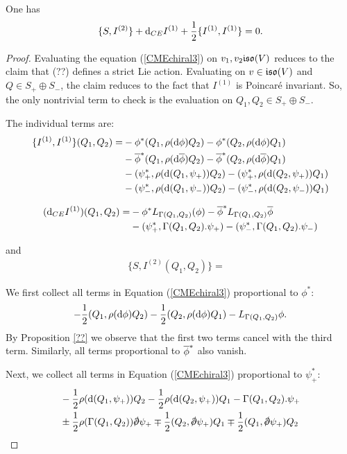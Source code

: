 \documentclass[10pt, oneside]{article}
\begin{document}
\begin{lemma} 
One has
\begin{equation}\label{CMEchiral3}
\{S, I^{(2)}\} + \d_{CE} I^{(1)} + \frac{1}{2} \{I^{(1)}, I^{(1)}\} = 0 .
\end{equation}
\end{lemma}
\begin{proof}
Evaluating the equation (\ref{CMEchiral3}) on $v_1,v_2 \mf{iso}(V)$ reduces to the claim that (??) defines a strict Lie action. 
Evaluating on $v \in \mf{iso}(V)$ and $Q \in S_+ \oplus S_-$, the claim reduces to the fact that $I^{(1)}$ is Poincar\'{e} invariant.
So, the only nontrivial term to check is the evaluation on $Q_1,Q_2 \in S_+ \oplus S_-$. 

The individual terms are:
\begin{align*}
\{I^{(1)}, I^{(1)}\}(Q_1, Q_2) = & - \phi^* (Q_1, \rho(\d \phi) Q_2) - \phi^* (Q_2, \rho(\d \phi)Q_1) \\ & - \Bar{\phi}^* (Q_1, \rho(\d \Bar{\phi}) Q_2) - \Bar{\phi}^* (Q_2, \rho(\d \Bar{\phi})Q_1) \\ &  -  (\psi_+^*, \rho(\d(Q_1,\psi_+))Q_2) - (\psi_+^*, \rho(\d(Q_2, \psi_+)) Q_1) \\ & - (\psi_-^*, \rho(\d(Q_1, \psi_-)) Q_2) - (\psi_-^*, \rho(\d(Q_2, \psi_-))Q_1) 
\end{align*}

\begin{align*}
(\d_{CE}I^{(1)})(Q_1,Q_2) = & - \phi^* L_{\Gamma(Q_1,Q_2)} (\phi) - \Bar{\phi}^* L_{\Gamma(Q_1,Q_2)} \Bar{\phi} \\ &  - (\psi_+^* , \Gamma(Q_1,Q_2) . \psi_+) - (\psi_-^*, \Gamma(Q_1,Q_2) . \psi_-)
\end{align*}

and
\begin{align*}
\{S, I^{(2)}(Q_1,Q_2)\} = & 
\end{align*}

We first collect all terms in Equation (\ref{CMEchiral3}) proportional to $\phi^*$:
\[
- \frac{1}{2} (Q_1, \rho(\d\phi) Q_2) - \frac{1}{2} (Q_2, \rho(\d \phi) Q_1) - L_{\Gamma(Q_1,Q_2)} \phi .
\]
By Proposition \ref{??}
 we observe that the first two terms cancel with the third term. 
Similarly, all terms proportional to $\Bar{\phi}^*$ also vanish. 

Next, we collect all terms in Equation (\ref{CMEchiral3}) proportional to $\psi_+^*$:
\begin{align*}
& - \frac{1}{2} \rho(\d(Q_1,\psi_+))Q_2 - \frac{1}{2} \rho(\d(Q_2, \psi_+)) Q_1 - \Gamma(Q_1,Q_2) . \psi_+
\\ 
& \pm \frac{1}{2} \rho(\Gamma(Q_1,Q_2)) \sd \dd \psi_+ \mp \frac{1}{2} (Q_2, \sd \dd \psi_+)Q_1 \mp \frac{1}{2} (Q_1, \sd \dd \psi_+)Q_2
\end{align*}

\end{proof}
\end{document}
